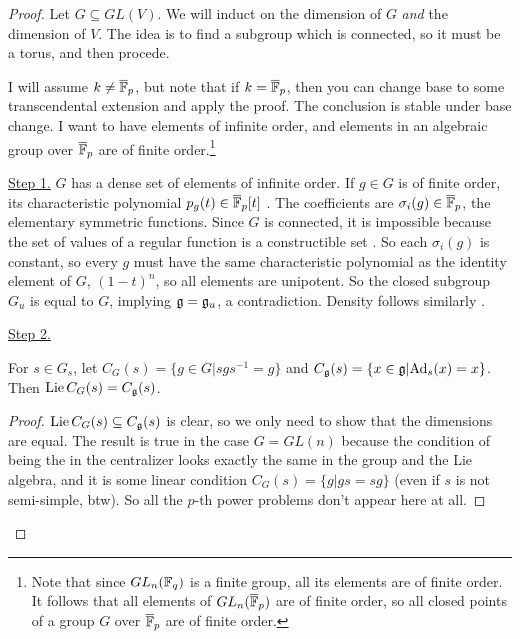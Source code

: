 \begin{proof}
 Let $G\subseteq GL(V)$. We will induct on the dimension of $G$ \emph{and} the dimension of $V$. The idea is to find a subgroup which is connected, so it must be a torus, and then procede.
 
 I will assume $k\neq \overline{\mathbb{F}}_p$, but note that if $k=\overline {\mathbb{F}}_p$, then you can change base to some transcendental extension and apply the proof. The conclusion is stable under base change. I want to have elements of infinite order, and elements in an algebraic group over $\overline {\mathbb{F}}_p$ are of finite order.\footnote{Note that since $GL_n(\mathbb{F}_q)$ is a finite group, all its elements are of finite order. It follows that all elements of $GL_n(\overline {\mathbb{F}}_p)$ are of finite order, so all closed points of a group $G$ over $\overline {\mathbb{F}}_p$ are of finite order.}
 
 \underline{Step 1.} $G$ has a dense set of elements of infinite order. If $g\in G$ is of finite order, its characteristic polynomial $p_g(t)\in \overline{\mathbb{F}}_p[t]$ . The coefficients are $\sigma_i(g)\in \overline{\mathbb{F}}_p$, the elementary symmetric functions. Since $G$ is connected, it is impossible because the set of values of a regular function is a constructible set . So each $\sigma_i(g)$ is constant, so every $g$ must have the same characteristic polynomial as the identity element of $G$, $(1-t)^n$, so all elements are unipotent. So the closed subgroup $G_u$ is equal to $G$, implying $\mathfrak{g}=\mathfrak{g}_u$, a contradiction. Density follows similarly .
 
 \underline{Step 2.}
 \begin{lemma}
  For $s\in G_s$, let $C_G(s)=\{g\in G|sgs^{-1}=g\}$ and $C_{\mathfrak{g}}(s)=\{x\in \mathfrak{g}|\mathrm{Ad}_s(x)=x\}$. Then $\operatorname{Lie} C_G(s)=C_{\mathfrak{g}}(s)$.
 \end{lemma}
 \begin{proof}
  $\operatorname{Lie} C_G(s)\subseteq C_{\mathfrak{g}}(s)$ is clear, so we only need to show that the dimensions are equal. The result is true in the case $G=GL(n)$ because the condition of being the in the centralizer looks exactly the same in the group and the Lie algebra, and it is some linear condition $C_G(s)=\{g|gs=sg\}$ (even if $s$ is not semi-simple, btw). So all the $p$-th power problems don't appear here at all. 
  

\end{proof}
\end{proof}
